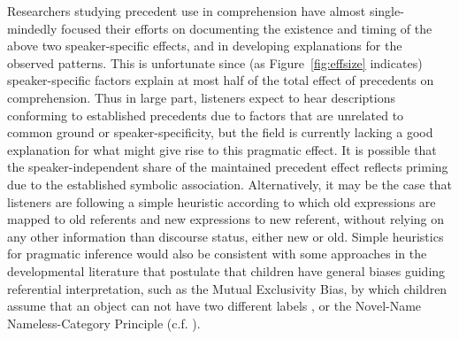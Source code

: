 \documentclass[doc,fignum,apacite,floatsintext]{apa6}
\begin{document}
Researchers studying precedent use in comprehension have almost single-mindedly focused their efforts on documenting the existence and timing of the above two speaker-specific effects, and in developing explanations for the observed patterns.  This is unfortunate since (as Figure~\ref{fig:effsize} indicates) speaker-specific factors explain at most half of the total effect of precedents on comprehension.  Thus in large part, listeners expect to hear descriptions conforming to established precedents due to factors that are unrelated to common ground or speaker-specificity, but the field is currently lacking a good explanation for what might give rise to this pragmatic effect.  It is possible that the speaker-independent share of the maintained precedent effect reflects priming due to the established symbolic association.  Alternatively, it may be the case that listeners are following a simple heuristic according to which old expressions are mapped to old referents and new expressions to new referent\cite{kronmullerbarr07}, without relying on any other information than discourse status, either new or old.  Simple heuristics for pragmatic inference would also be consistent with some approaches in the developmental literature that postulate that children have general biases guiding referential interpretation, such as the Mutual Exclusivity Bias, by which children assume that an object can not have two different labels \cite{markmanwachtel88}, or the Novel-Name Nameless-Category Principle \cite{mervisbertrand94} (c.f. \cite{diesendruck05,diesendruckmarkson01}).
\end{document}
